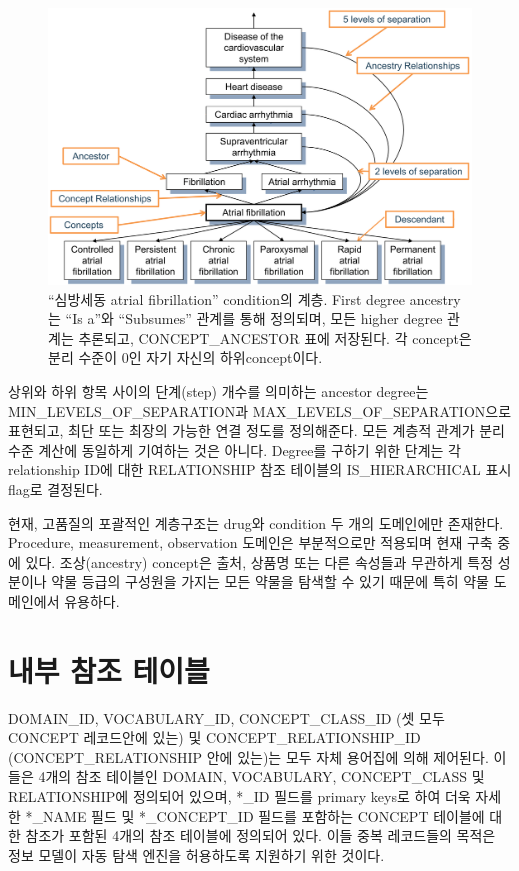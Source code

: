 \documentclass[11pt]{book}
\theoremstyle{definition}
\theoremstyle{definition}
\theoremstyle{definition}
\theoremstyle{remark}
\begin{document}
\begin{figure}

{\centering \includegraphics[width=1\linewidth]{images/StandardizedVocabularies/conceptAncestor} 

}

\caption{``심방세동 atrial fibrillation'' condition의 계층. First
degree ancestry는 ``Is a''와 ``Subsumes'' 관계를 통해 정의되며, 모든
higher degree 관계는 추론되고, CONCEPT\_ANCESTOR 표에 저장된다. 각
concept은 분리 수준이 0인 자기 자신의 하위concept이다.
}\label{fig:conceptAncestor}
\end{figure}

상위와 하위 항목 사이의 단계(step) 개수를 의미하는 ancestor degree는
MIN\_LEVELS\_OF\_SEPARATION과 MAX\_LEVELS\_OF\_SEPARATION으로 표현되고,
최단 또는 최장의 가능한 연결 정도를 정의해준다. 모든 계층적 관계가 분리
수준 계산에 동일하게 기여하는 것은 아니다. Degree를 구하기 위한 단계는
각 relationship ID에 대한 RELATIONSHIP 참조 테이블의 IS\_HIERARCHICAL
표시 flag로 결정된다.

현재, 고품질의 포괄적인 계층구조는 drug와 condition 두 개의 도메인에만
존재한다. Procedure, measurement, observation 도메인은 부분적으로만
적용되며 현재 구축 중에 있다. 조상(ancestry) concept은 출처, 상품명 또는
다른 속성들과 무관하게 특정 성분이나 약물 등급의 구성원을 가지는 모든
약물을 탐색할 수 있기 때문에 특히 약물 도메인에서 유용하다.

\section{내부 참조 테이블}\label{--}

DOMAIN\_ID, VOCABULARY\_ID, CONCEPT\_CLASS\_ID (셋 모두 CONCEPT
레코드안에 있는) 및 CONCEPT\_RELATIONSHIP\_ID (CONCEPT\_RELATIONSHIP
안에 있는)는 모두 자체 용어집에 의해 제어된다. 이들은 4개의 참조
테이블인 DOMAIN, VOCABULARY, CONCEPT\_CLASS 및 RELATIONSHIP에 정의되어
있으며, *\_ID 필드를 primary keys로 하여 더욱 자세한 *\_NAME 필드 및
*\_CONCEPT\_ID 필드를 포함하는 CONCEPT 테이블에 대한 참조가 포함된 4개의
참조 테이블에 정의되어 있다. 이들 중복 레코드들의 목적은 정보 모델이
자동 탐색 엔진을 허용하도록 지원하기 위한 것이다.
\end{document}
